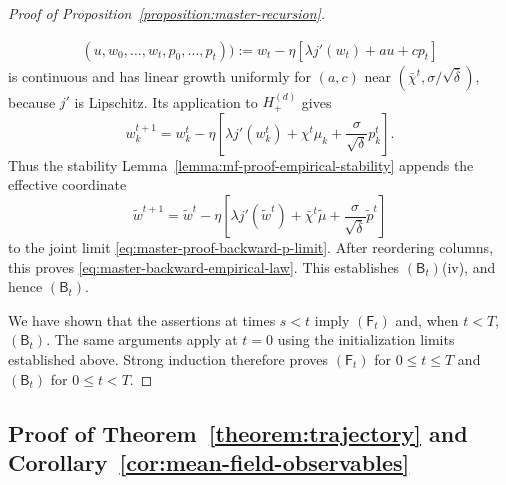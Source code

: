 \begin{proof}[Proof of Proposition~\ref{proposition:master-recursion}]
\begin{enumerate}[wide]
\begin{enumerate}[label=(\alph*),wide]
\[\begin{aligned}
                (u,w_0,\ldots,w_t,p_0,\ldots,p_t)
            \bigr)
            :=
            w_t-\eta\left[
                \lambda j'(w_t)+au+cp_t
            \right]
        \end{aligned}
        \]
        is continuous and has linear growth uniformly for
        $(a,c)$ near
        $(\bar\chi^t,\sigma/\sqrt{\bar\delta})$,
        because $j'$ is Lipschitz.
        Its application to $H^{(d)}_+$ gives
        \[
            w_k^{t+1}
            =
            w_k^t-\eta\left[
                \lambda j'(w_k^t)
                +\chi^t\mu_k
                +\frac{\sigma}{\sqrt\delta}p_k^t
            \right].
        \]
        Thus the stability Lemma~\ref{lemma:mf-proof-empirical-stability} appends the effective coordinate
        \[
            \tilde w^{t+1}
            =
            \tilde w^t-\eta\left[
                \lambda j'(\tilde w^t)
                +\bar\chi^t\tilde\mu
                +\frac{\sigma}{\sqrt{\bar\delta}}\tilde p^t
            \right]
        \]
        to the joint limit
        \eqref{eq:master-proof-backward-p-limit}.
        After reordering columns, this proves
        \eqref{eq:master-backward-empirical-law}.
        This establishes $(\mathsf B_t)$(iv), and hence
        $(\mathsf B_t)$.
    \end{enumerate}
\end{enumerate}

We have shown that the assertions at times $s<t$ imply
$(\mathsf F_t)$ and, when $t<T$, $(\mathsf B_t)$.
The same arguments apply at $t=0$ using the initialization
limits established above.
Strong induction therefore proves $(\mathsf F_t)$ for
$0\leq t\leq T$ and $(\mathsf B_t)$ for $0\leq t<T$.

\end{proof}

\subsection{Proof of Theorem~\ref{theorem:trajectory}
and Corollary~\ref{cor:mean-field-observables}}
\label{subsec:proof-trajectory}

